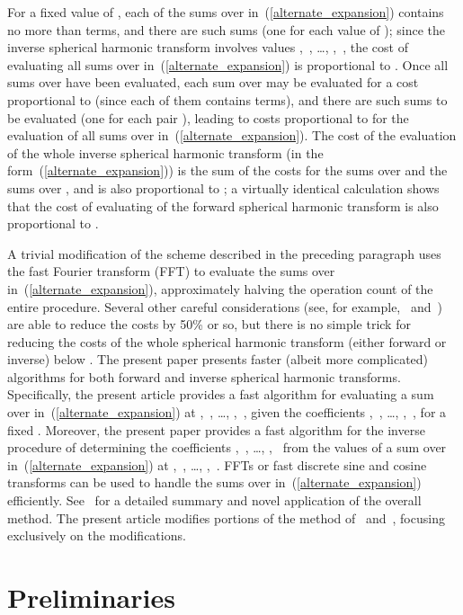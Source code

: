 \documentclass[final,3p,times]{elsarticle}
\begin{document}
For a fixed value of , each of the sums over 
in~(\ref{alternate_expansion}) contains no more than  terms,
and there are  such sums (one for each value of );
since the inverse spherical harmonic transform involves  values
,~, \dots, ,~,
the cost of evaluating all sums over  in~(\ref{alternate_expansion})
is proportional to . Once all sums over  have been evaluated,
each sum over  may be evaluated for a cost proportional to 
(since each of them contains  terms),
and there are  such sums to be evaluated
(one for each pair ),
leading to costs proportional to  for the evaluation of
all sums over  in~(\ref{alternate_expansion}).
The cost of the evaluation of the whole inverse spherical harmonic transform
(in the form~(\ref{alternate_expansion})) is the sum
of the costs for the sums over  and the sums over ,
and is also proportional to ;
a virtually identical calculation shows that the cost of evaluating
of the forward spherical harmonic transform is also proportional to .

A trivial modification of the scheme described in the preceding paragraph
uses the fast Fourier transform (FFT) to evaluate the sums over 
in~(\ref{alternate_expansion}),
approximately halving the operation count of the entire procedure.
Several other careful considerations
(see, for example,~\cite{adams-swarztrauber} and~\cite{swarztrauber-spotz})
are able to reduce the costs by 50\% or so,
but there is no simple trick for reducing the costs
of the whole spherical harmonic transform (either forward or inverse)
below . The present paper presents faster (albeit more complicated)
algorithms for both forward and inverse spherical harmonic transforms.
Specifically, the present article provides a fast algorithm
for evaluating a sum over  in~(\ref{alternate_expansion})
at ,~, \dots, ,~,
given the coefficients ,~, \dots,
,~, for a fixed .
Moreover, the present paper provides a fast algorithm
for the inverse procedure of determining the coefficients
,~, \dots, ,~
from the values of a sum over  in~(\ref{alternate_expansion})
at ,~, \dots, ,~.
FFTs or fast discrete sine and cosine transforms can be used
to handle the sums over  in~(\ref{alternate_expansion}) efficiently.
See~\cite{reuter-ratner-seideman} for a detailed summary and novel application
of the overall method. The present article modifies portions of the method
of~\cite{reuter-ratner-seideman} and~\cite{tygert_sph},
focusing exclusively on the modifications.



\section{Preliminaries}
\label{prelims}
\end{document}
